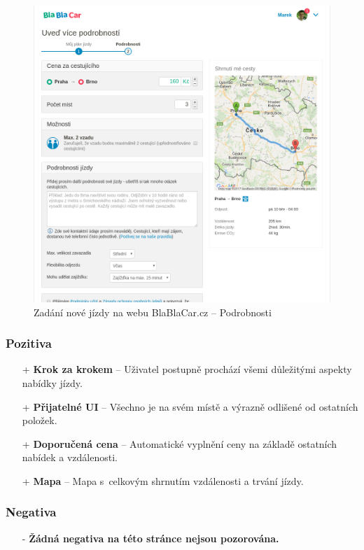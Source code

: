 \begin{figure}[h]
    \centering
    \includegraphics[width=1.0\textwidth]{media/blablacar/offer2.png}
    \caption{Zadání nové jízdy na webu BlaBlaCar.cz -- Podrobnosti}
    \label{fig:blablacar:offer2}
\end{figure}
\subsubsection*{Pozitiva}
\begin{itemize}
    \item[+] \textbf{Krok za krokem} -- Uživatel postupně prochází všemi důležitými aspekty nabídky jízdy.
    \item[+] \textbf{Přijatelné UI} -- Všechno je na svém místě a výrazně odlišené od ostatních položek.
    \item[+] \textbf{Doporučená cena} -- Automatické vyplnění ceny na základě ostatních nabídek a vzdálenosti.
    \item[+] \textbf{Mapa} -- Mapa s~celkovým shrnutím vzdálenosti a trvání jízdy.
\end{itemize}
\subsubsection*{Negativa}
\begin{itemize}
    \item[-] \textbf{Žádná negativa na této stránce nejsou pozorována.}
\end{itemize}


